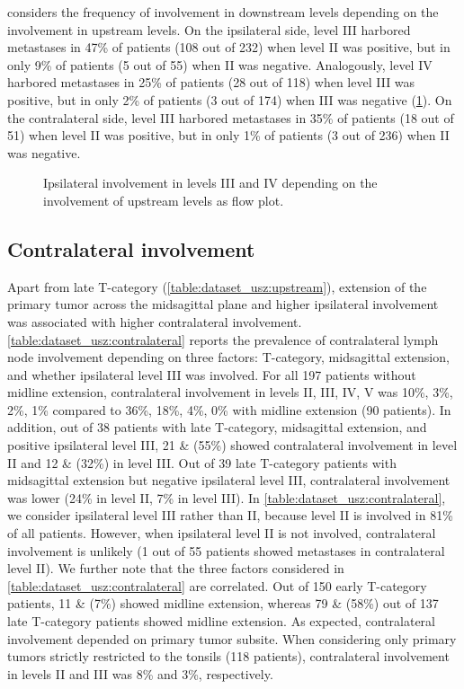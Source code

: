 \documentclass[\relativeRoot/main.tex]{subfiles}
\begin{document}
 considers the frequency of involvement in downstream levels depending on the involvement in upstream levels. On the ipsilateral side, level III harbored metastases in 47\% of patients (108 out of 232) when level II was positive, but in only 9\% of patients (5 out of 55) when II was negative. Analogously, level IV harbored metastases in 25\% of patients (28 out of 118) when level III was positive, but in only 2\% of patients (3 out of 174) when III was negative (\cref{fig:dataset_usz:flowchart}). On the contralateral side, level III harbored metastases in 35\% of patients (18 out of 51) when level II was positive, but in only 1\% of patients (3 out of 236) when II was negative.

\begin{figure}
    \def\svgwidth{1.0\textwidth}
    
    \caption[Flowchart showing the correlations of ipsilateral involvement in the LNLs II, III and IV]{
        Ipsilateral involvement in levels III and IV depending on the involvement of upstream levels as flow plot.
    }
    \label{fig:dataset_usz:flowchart}
\end{figure}

\subsection*{Contralateral involvement}

Apart from late T-category (\cref{table:dataset_usz:upstream}), extension of the primary tumor across the midsagittal plane and higher ipsilateral involvement was associated with higher contralateral involvement. \cref{table:dataset_usz:contralateral} reports the prevalence of contralateral lymph node involvement depending on three factors: T-category, midsagittal extension, and whether ipsilateral level III was involved. For all 197 patients without midline extension, contralateral involvement in levels II, III, IV, V was 10\%, 3\%, 2\%, 1\% compared to 36\%, 18\%, 4\%, 0\% with midline extension (90 patients). In addition, out of 38 patients with late T-category, midsagittal extension, and positive ipsilateral level III, 21 \& (55\%) showed contralateral involvement in level II and 12 \& (32\%) in level III. Out of 39 late T-category patients with midsagittal extension but negative ipsilateral level III, contralateral involvement was lower (24\% in level II, 7\% in level III). In \cref{table:dataset_usz:contralateral}, we consider ipsilateral level III rather than II, because level II is involved in 81\% of all patients. However, when ipsilateral level II is not involved, contralateral involvement is unlikely (1 out of 55 patients showed metastases in contralateral level II). We further note that the three factors considered in \cref{table:dataset_usz:contralateral} are correlated. Out of 150 early T-category patients, 11 \& (7\%) showed midline extension, whereas 79 \& (58\%) out of 137 late T-category patients showed midline extension. As expected, contralateral involvement depended on primary tumor subsite. When considering only primary tumors strictly restricted to the tonsils (118 patients), contralateral involvement in levels II and III was 8\% and 3\%, respectively.
\end{document}

